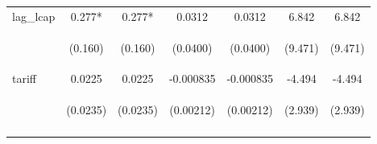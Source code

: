 \documentclass{article}
\begin{document}
\begin{table}[htbp]
{\begin{tabular}{lcccccc}
lag\_lcap & 0.277* & 0.277* & 0.0312 & 0.0312 & 6.842 & 6.842 \\
\vspace{4pt} & \begin{footnotesize}(0.160)\end{footnotesize} & \begin{footnotesize}(0.160)\end{footnotesize} & \begin{footnotesize}(0.0400)\end{footnotesize} & \begin{footnotesize}(0.0400)\end{footnotesize} & \begin{footnotesize}(9.471)\end{footnotesize} & \begin{footnotesize}(9.471)\end{footnotesize} \\
tariff & 0.0225 & 0.0225 & -0.000835 & -0.000835 & -4.494 & -4.494 \\
 & \begin{footnotesize}(0.0235)\end{footnotesize} & \begin{footnotesize}(0.0235)\end{footnotesize} & \begin{footnotesize}(0.00212)\end{footnotesize} & \begin{footnotesize}(0.00212)\end{footnotesize} & \begin{footnotesize}(2.939)\end{footnotesize} & \begin{footnotesize}(2.939)\end{footnotesize} \\
\vspace{4pt} & \begin{footnotesize}\end{footnotesize} & \begin{footnotesize}\end{footnotesize} & \begin{footnotesize}\end{footnotesize} & \begin{footnotesize}\end{footnotesize} & \begin{footnotesize}\end{footnotesize} & \begin{footnotesize}\end{footnotesize} \\ \hline

\end{tabular}}
\end{table}
\end{document}
